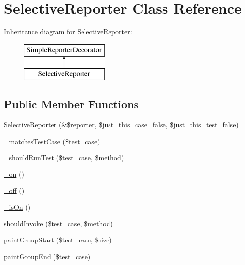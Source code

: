 \hypertarget{class_selective_reporter}{
\section{SelectiveReporter Class Reference}
\label{class_selective_reporter}
}
Inheritance diagram for SelectiveReporter:\begin{figure}[H]
\begin{center}
\leavevmode
\includegraphics[height=2.000000cm]{class_selective_reporter}
\end{center}
\end{figure}
\subsection*{Public Member Functions}
\begin{DoxyCompactItemize}
\item 
\hyperlink{class_selective_reporter_af10c55382508bba90e9a7c1c2e88a695}{SelectiveReporter} (\&\$reporter, \$just\_\-this\_\-case=false, \$just\_\-this\_\-test=false)
\item 
\hyperlink{class_selective_reporter_af2344a42987b67d671c8e02a91c5b4fd}{\_\-matchesTestCase} (\$test\_\-case)
\item 
\hyperlink{class_selective_reporter_aec4a64bdd3c2531229d6c0f34aa78f03}{\_\-shouldRunTest} (\$test\_\-case, \$method)
\item 
\hyperlink{class_selective_reporter_aa09eb9deff7a2fcd6f35cb441b4458cb}{\_\-on} ()
\item 
\hyperlink{class_selective_reporter_a2e55fad83e680bd660ab309b86d72d88}{\_\-off} ()
\item 
\hyperlink{class_selective_reporter_a84b7ad4af2744887f8f60e504a027647}{\_\-isOn} ()
\item 
\hyperlink{class_selective_reporter_a33b86430bc37e8c5f35c246789a9a105}{shouldInvoke} (\$test\_\-case, \$method)
\item 
\hyperlink{class_selective_reporter_af83e76607ce4fed137722eadc77549ff}{paintGroupStart} (\$test\_\-case, \$size)
\item 
\hyperlink{class_selective_reporter_a3d49dee3f9831508049c46b3f8bc48e1}{paintGroupEnd} (\$test\_\-case)
\end{DoxyCompactItemize}

